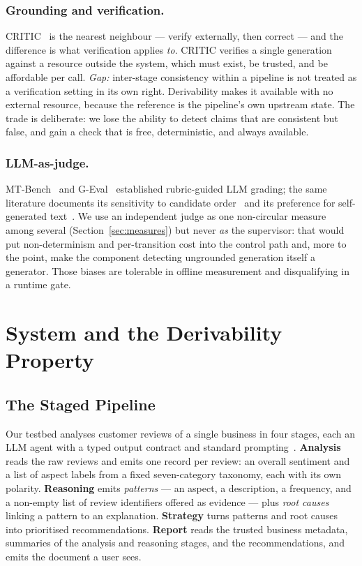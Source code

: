 \documentclass[runningheads]{llncs}
\begin{document}
\subsubsection{Grounding and verification.}
CRITIC~\cite{critic} is the nearest neighbour --- verify externally, then correct
--- and the difference is what verification applies \emph{to}. CRITIC verifies a
single generation against a resource outside the system, which must exist, be
trusted, and be affordable per call. \emph{Gap:} inter-stage consistency within a
pipeline is not treated as a verification setting in its own right. Derivability
makes it available with no external resource, because the reference is the
pipeline's own upstream state. The trade is deliberate: we lose the ability to
detect claims that are consistent but false, and gain a check that is free,
deterministic, and always available.

\subsubsection{LLM-as-judge.}
MT-Bench~\cite{mtbench} and G-Eval~\cite{geval} established rubric-guided LLM
grading; the same literature documents its sensitivity to candidate
order~\cite{positionbias} and its preference for self-generated
text~\cite{selfpreference}. We use an independent judge as one non-circular
measure among several (Section~\ref{sec:measures}) but never \emph{as} the
supervisor: that would put non-determinism and per-transition cost into the
control path and, more to the point, make the component detecting ungrounded
generation itself a generator. Those biases are tolerable in offline measurement
and disqualifying in a runtime gate.

\section{System and the Derivability Property}
\label{sec:system}

\subsection{The Staged Pipeline}
\label{sec:pipeline}

Our testbed analyses customer reviews of a single business in four stages, each an
LLM agent with a typed output contract and standard
prompting~\cite{cot,react}. \textbf{Analysis} reads the raw reviews and emits one
record per review: an overall sentiment and a list of aspect labels from a fixed
seven-category taxonomy, each with its own polarity. \textbf{Reasoning} emits
\emph{patterns} --- an aspect, a description, a frequency, and a non-empty list of
review identifiers offered as evidence --- plus \emph{root causes} linking a
pattern to an explanation. \textbf{Strategy} turns patterns and root causes into
prioritised recommendations. \textbf{Report} reads the trusted business metadata,
summaries of the analysis and reasoning stages, and the recommendations, and emits
the document a user sees.
\end{document}

